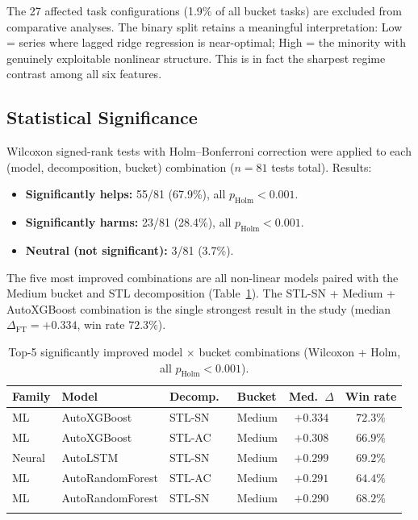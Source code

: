\documentclass[pdflatex,sn-mathphys-num]{sn-jnl}
\theoremstyle{thmstyleone}
\theoremstyle{thmstyletwo}
\theoremstyle{thmstylethree}
\begin{document}
The 27 affected task configurations (1.9\% of all bucket tasks) are excluded
from comparative analyses.
The binary split retains a meaningful interpretation: Low = series where
lagged ridge regression is near-optimal; High = the minority with
genuinely exploitable nonlinear structure.
This is in fact the sharpest regime contrast among all six features.

\subsection{Statistical Significance}\label{sec:significance}

Wilcoxon signed-rank tests with Holm--Bonferroni correction were applied to
each (model, decomposition, bucket) combination ($n = 81$ tests total).
Results:

\begin{itemize}
  \item \textbf{Significantly helps:} 55/81 (67.9\%),
        all $p_{\mathrm{Holm}} < 0.001$.
  \item \textbf{Significantly harms:} 23/81 (28.4\%),
        all $p_{\mathrm{Holm}} < 0.001$.
  \item \textbf{Neutral (not significant):} 3/81 (3.7\%).
\end{itemize}

The five most improved combinations are all non-linear models paired with
the Medium bucket and STL decomposition (Table~\ref{tab:top5_sig}).
The STL-SN + Medium + AutoXGBoost combination is the single strongest result
in the study (median $\Delta_{\mathrm{FT}} = +0.334$, win rate $72.3\%$).

\begin{table}[ht]
\caption{Top-5 significantly improved model $\times$ bucket combinations
(Wilcoxon + Holm, all $p_{\mathrm{Holm}} < 0.001$).}\label{tab:top5_sig}
\begin{tabular*}{\textwidth}{@{\extracolsep\fill}llllcc}
\toprule
Family & Model & Decomp.\ & Bucket & Med.\ $\Delta$ & Win rate \\
\midrule
ML          & AutoXGBoost      & STL-SN & Medium & $+0.334$ & $72.3\%$ \\
ML          & AutoXGBoost      & STL-AC & Medium & $+0.308$ & $66.9\%$ \\
Neural      & AutoLSTM         & STL-SN & Medium & $+0.299$ & $69.2\%$ \\
ML          & AutoRandomForest & STL-AC & Medium & $+0.291$ & $64.4\%$ \\
ML          & AutoRandomForest & STL-SN & Medium & $+0.290$ & $68.2\%$ \\
\botrule
\end{tabular*}
\end{table}
\end{document}
